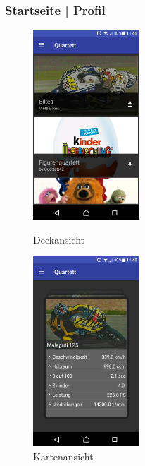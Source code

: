 \documentclass{scrartcl}
\begin{document}
\subsubsection{Startseite | Profil}

\begin{figure}[!ht]
  \centering
  \begin{minipage}{0.45\textwidth}
    \centering
    \includegraphics[width=4cm]{img/gallery_decks.png}
    \caption{Deckansicht}
  \end{minipage}
  \hfill
  \begin{minipage}{0.45\textwidth}
    \centering
    \includegraphics[width=4cm]{img/gallery_cards.png}
    \caption{Kartenansicht}
  \end{minipage}
\end{figure}
\end{document}
